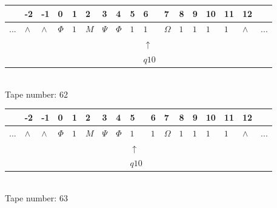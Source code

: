 \documentclass[11pt]{article}
\begin{document}
\begin{table}[H]
\centering
\begin{tabular}{lllllllllllllllll}
 & -2 & -1 & 0 & 1 & 2 & 3 & 4 & 5 & 6 & 7 & 8 & 9 & 10 & 11 & 12 & \\
\hline
$...$ & \multicolumn{1}{|l|}{$\wedge$} & \multicolumn{1}{|l|}{$\wedge$} & \multicolumn{1}{|l|}{$\Phi$} & \multicolumn{1}{|l|}{$1$} & \multicolumn{1}{|l|}{$M$} & \multicolumn{1}{|l|}{$\Psi$} & \multicolumn{1}{|l|}{$\Phi$} & \multicolumn{1}{|l|}{$1$} & \multicolumn{1}{|l|}{$1$} & \multicolumn{1}{|l|}{$\Omega$} & \multicolumn{1}{|l|}{$1$} & \multicolumn{1}{|l|}{$1$} & \multicolumn{1}{|l|}{$1$} & \multicolumn{1}{|l|}{$1$} & \multicolumn{1}{|l|}{$\wedge$} & $...$\\
\hline
&  &  &  &  &  &  &  &  & $\uparrow$ &  &  &  &  &  &  &  \\
&  &  &  &  &  &  &  &  & $ q10 $ &  &  &  &  &  &  &  \\
\end{tabular}
\\
Tape number: 62
\noindent\makebox[\linewidth]{\hdashrule{\textwidth}{1pt}{1pt}}\end{table}

\begin{table}[H]
\centering
\begin{tabular}{lllllllllllllllll}
 & -2 & -1 & 0 & 1 & 2 & 3 & 4 & 5 & 6 & 7 & 8 & 9 & 10 & 11 & 12 & \\
\hline
$...$ & \multicolumn{1}{|l|}{$\wedge$} & \multicolumn{1}{|l|}{$\wedge$} & \multicolumn{1}{|l|}{$\Phi$} & \multicolumn{1}{|l|}{$1$} & \multicolumn{1}{|l|}{$M$} & \multicolumn{1}{|l|}{$\Psi$} & \multicolumn{1}{|l|}{$\Phi$} & \multicolumn{1}{|l|}{$1$} & \multicolumn{1}{|l|}{$1$} & \multicolumn{1}{|l|}{$\Omega$} & \multicolumn{1}{|l|}{$1$} & \multicolumn{1}{|l|}{$1$} & \multicolumn{1}{|l|}{$1$} & \multicolumn{1}{|l|}{$1$} & \multicolumn{1}{|l|}{$\wedge$} & $...$\\
\hline
&  &  &  &  &  &  &  & $\uparrow$ &  &  &  &  &  &  &  &  \\
&  &  &  &  &  &  &  & $ q10 $ &  &  &  &  &  &  &  &  \\
\end{tabular}
\\
Tape number: 63
\noindent\makebox[\linewidth]{\hdashrule{\textwidth}{1pt}{1pt}}\end{table}
\end{document}
